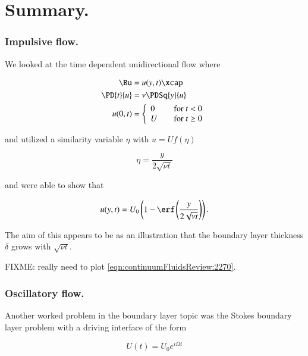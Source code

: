 \section{Summary.}
\subsubsection{Impulsive flow.}

We looked at the time dependent unidirectional flow where

\begin{align}\label{eqn:continuumFluidsReview:2230}
\Bu &= u(y, t) \xcap \\
\PD{t}{u} &= \nu \PDSq{y}{u} \\
u(0, t) &=
\left\{
\begin{array}{l l}
0 & \quad \mbox{for $t < 0$} \\
U & \quad \mbox{for $t \ge 0$}
\end{array}
\right.
\end{align}

and utilized a similarity variable $\eta$ with $u = U f(\eta)$

\begin{equation}\label{eqn:continuumFluidsReview:2250}
\eta = \frac{y}{2 \sqrt{\nu t}}
\end{equation}

and were able to show that

\begin{equation}\label{eqn:continuumFluidsReview:2270}
u(y, t) = U_0 \left(1 - \erf\left(\frac{y}{2 \sqrt{\nu t}}\right) \right).
\end{equation}

The aim of this appears to be as an illustration that the boundary layer thickness $\delta$ grows with $\sqrt{\nu t}$.

FIXME: really need to plot \ref{eqn:continuumFluidsReview:2270}.

\subsubsection{Oscillatory flow.}

Another worked problem in the boundary layer topic was the Stokes boundary layer problem with a driving interface of the form

\begin{equation}\label{eqn:continuumFluidsReview:2370}
U(t) = U_0 e^{i \Omega t}
\end{equation}

